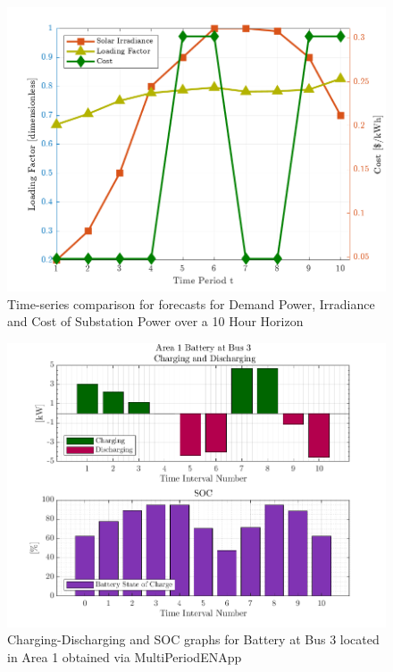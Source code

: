 \documentclass[../../outputs/main.tex]{subfiles}
\begin{document}
\begin{figure}[h!]
    \centering
    \includegraphics[height=0.25\textheight]{../figures/T10-inputCurves/InputCurves_Horizon_10_pv_20_batt_30.png}
    \caption{Time-series comparison for forecasts for Demand Power, Irradiance and Cost of Substation Power over a 10 Hour Horizon}
    \label{fig:inputCurve-10}
\end{figure}



\begin{figure}[h!]
    \centering
    \includegraphics[width=\linewidth]{../figures/T10-pv20-batt30-genCost/dopf/BatteryPlots/macroItr_5_genCost_Battery_1_alpha_0.001.png}
    \caption{Charging-Discharging and SOC graphs for Battery at Bus 3 located in Area 1 obtained via MultiPeriodENApp}
    \label{fig:batt-plot-dopf-10-20-30-genCost}
\end{figure}
    

\lipsum[1]
\end{document}

